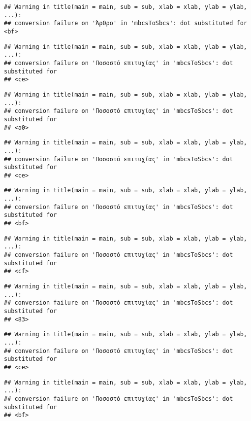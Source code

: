 \documentclass[
]{article}
\begin{document}
\begin{verbatim}
## Warning in title(main = main, sub = sub, xlab = xlab, ylab = ylab, ...):
## conversion failure on 'Άρθρο' in 'mbcsToSbcs': dot substituted for <bf>
\end{verbatim}

\begin{verbatim}
## Warning in title(main = main, sub = sub, xlab = xlab, ylab = ylab, ...):
## conversion failure on 'Ποσοστό επιτυχίας' in 'mbcsToSbcs': dot substituted for
## <ce>
\end{verbatim}

\begin{verbatim}
## Warning in title(main = main, sub = sub, xlab = xlab, ylab = ylab, ...):
## conversion failure on 'Ποσοστό επιτυχίας' in 'mbcsToSbcs': dot substituted for
## <a0>
\end{verbatim}

\begin{verbatim}
## Warning in title(main = main, sub = sub, xlab = xlab, ylab = ylab, ...):
## conversion failure on 'Ποσοστό επιτυχίας' in 'mbcsToSbcs': dot substituted for
## <ce>
\end{verbatim}

\begin{verbatim}
## Warning in title(main = main, sub = sub, xlab = xlab, ylab = ylab, ...):
## conversion failure on 'Ποσοστό επιτυχίας' in 'mbcsToSbcs': dot substituted for
## <bf>
\end{verbatim}

\begin{verbatim}
## Warning in title(main = main, sub = sub, xlab = xlab, ylab = ylab, ...):
## conversion failure on 'Ποσοστό επιτυχίας' in 'mbcsToSbcs': dot substituted for
## <cf>
\end{verbatim}

\begin{verbatim}
## Warning in title(main = main, sub = sub, xlab = xlab, ylab = ylab, ...):
## conversion failure on 'Ποσοστό επιτυχίας' in 'mbcsToSbcs': dot substituted for
## <83>
\end{verbatim}

\begin{verbatim}
## Warning in title(main = main, sub = sub, xlab = xlab, ylab = ylab, ...):
## conversion failure on 'Ποσοστό επιτυχίας' in 'mbcsToSbcs': dot substituted for
## <ce>
\end{verbatim}

\begin{verbatim}
## Warning in title(main = main, sub = sub, xlab = xlab, ylab = ylab, ...):
## conversion failure on 'Ποσοστό επιτυχίας' in 'mbcsToSbcs': dot substituted for
## <bf>
\end{verbatim}
\end{document}
